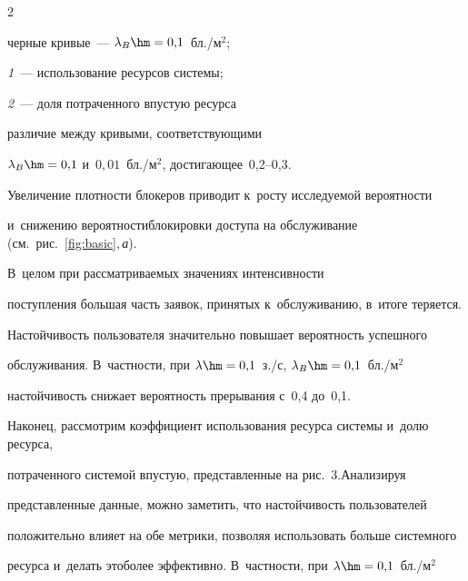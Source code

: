 \begin{multicols}{2}
{{{черные кривые~--- $\lambda_B\hm= 0{,}1$~бл./м$^2$;

\textit{1}~--- использование ресурсов сис\-те\-мы;

\textit{2}~--- доля потраченного впус\-тую ресурса}}}



\vspace*{12pt}



\noindent

 различие меж\-ду кривыми, со\-от\-вет\-ст\-ву\-ющи\-ми 

$\lambda_B\hm=0{,}1$ и~$0{,}01$~бл./м$^2$, до\-сти\-га\-ющее~0,2--0,3. 

Увеличение плот\-ности блокеров приводит к~рос\-ту ис\-сле\-ду\-емой ве\-ро\-ят\-ности 

и~снижению ве\-ро\-ят\-ности\linebreak блокировки до\-сту\-па на обслуживание (см.\ рис.~\ref{fig:basic},\,\textit{а}). 

В~целом при рас\-смат\-ри\-ва\-емых значениях ин\-тен\-сив\-ности 

по\-ступ\-ле\-ния большая часть заявок, принятых к~обслуживанию, в~итоге теряется. 

На\-стой\-чи\-вость пользователя значительно повышает ве\-ро\-ят\-ность успеш\-но\-го 

обслуживания. В~част\-ности, при $\lambda\hm=0{,}1$~з./с, $\lambda_B\hm=0{,}1$~бл./м$^2$ 

на\-стой\-чи\-вость снижает ве\-ро\-ят\-ность прерывания с~0,4 до~0,1. 

{



}






Наконец, рассмотрим коэффициент использования ресурса сис\-те\-мы и~долю ресурса, 

по\-тра\-чен\-но\-го сис\-те\-мой впус\-тую, пред\-став\-лен\-ные на рис.~3.\linebreak Анализируя 

пред\-став\-лен\-ные данные,  мож\-но заметить, что на\-стой\-чи\-вость пользователей 

положительно влияет на обе мет\-ри\-ки, поз\-во\-ляя использовать больше сис\-тем\-но\-го 

ресурса и~делать это\linebreak более эффективно. В~част\-ности, при $\lambda\hm=0{,}1$~бл./м$^2$ 


\end{multicols}
